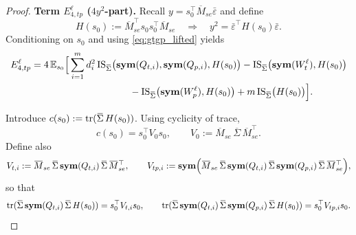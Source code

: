 \begin{proof}
\medskip
\noindent\textbf{Term $E^{\ell}_{4,tp}$ ($4y^2$-part).}
Recall $y=s_0^\top\overline M_{se}\bar\varepsilon$ and define
\[
H(s_0):=\overline M_{se}^\top s_0 s_0^\top\overline M_{se}
\quad\Rightarrow\quad
y^2=\bar\varepsilon^\top H(s_0)\bar\varepsilon .
\]
Conditioning on $s_0$ and using \eqref{eq:gtgp_lifted} yields
\begin{align}
E^{\ell}_{4,tp}
&=4\,\mathbb E_{s_0}\Big[
\sum_{i=1}^m d_i^2\,\mathrm{IS}_{\overline\Sigma} \big(\symfun(Q_{t,i}),\symfun(Q_{p,i}),H(s_0)\big)
-\mathrm{IS}_{\overline\Sigma} \big(\symfun(W^\ell_t),H(s_0)\big)\notag\\
&\hspace{3.6cm}
-\mathrm{IS}_{\overline\Sigma} \big(\symfun(W^\ell_p),H(s_0)\big)
+m\,\mathrm{IS}_{\overline\Sigma} \big(H(s_0)\big)\Big].
\label{eq:Dtp_ell_cond}
\end{align}

Introduce $c(s_0):=\tr(\overline\Sigma\,H(s_0))$. Using cyclicity of trace,
\begin{equation}\label{eq:cs0_V0}
c(s_0)=s_0^\top V_0 s_0,\qquad V_0:=\overline M_{se}\,\overline\Sigma\,\overline M_{se}^\top.
\end{equation}
Define also
\[
V_{t,i}:=\overline M_{se}\,\overline\Sigma\,\symfun(Q_{t,i})\,\overline\Sigma\,\overline M_{se}^\top,\qquad
V_{tp,i}:=\symfun \Big(\overline M_{se}\,\overline\Sigma\,\symfun(Q_{t,i})\,\overline\Sigma\,\symfun(Q_{p,i})\,\overline\Sigma\,\overline M_{se}^\top\Big),
\]
so that
\begin{equation}\label{eq:trace_to_quad_forms}
\tr(\overline\Sigma\,\symfun(Q_{t,i})\,\overline\Sigma\,H(s_0))=s_0^\top V_{t,i}s_0,\qquad
\tr(\overline\Sigma\,\symfun(Q_{t,i})\,\overline\Sigma\,\symfun(Q_{p,i})\,\overline\Sigma\,H(s_0))=s_0^\top V_{tp,i}s_0.
\end{equation}


\end{proof}

